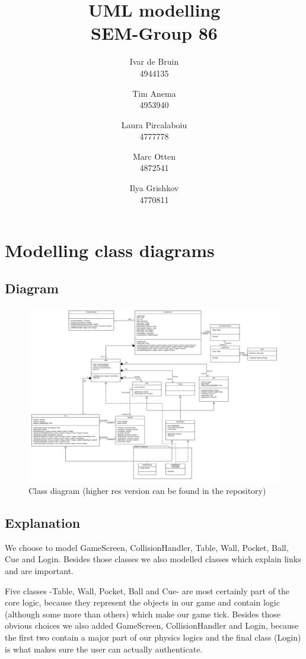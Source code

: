 \documentclass[10pt]{article}
\title{UML modelling\\SEM-Group 86}
\author{
	Ivar de Bruin\\
	4944135
	\and
	Tim Anema\\
	4953940
	\and
	Laura Pircalaboiu\\
	4777778
	\and
	Marc Otten\\
	4872541\\
	\and
	Ilya Grishkov\\
	4770811	
}
\let\oldsection\section
\renewcommand\section{\clearpage\oldsection}
\begin{document}
\maketitle
\pagebreak
\tableofcontents
\section{Modelling class diagrams}
\subsection{Diagram}
		\begin{figure}[H]
			\includegraphics[width=\linewidth]{latex_images/class_diagram.png}
			\caption{Class diagram (higher res version can be found in the repository)}
		\end{figure}
		
\subsection{Explanation}
\par We choose to model GameScreen, CollisionHandler, Table, Wall, Pocket, Ball, Cue and Login. Besides those classes we also modelled classes which explain links and are important.
\par Five classes -Table, Wall, Pocket, Ball and Cue- are most certainly part of the core logic, because they represent the objects in our game and contain logic (although some more than others) which make our game tick. Besides those obvious choices we also added GameScreen, CollisionHandler and Login, because the first two contain a major part of our physics logics and the final class (Login) is what makes sure the user can actually authenticate.
\end{document}
